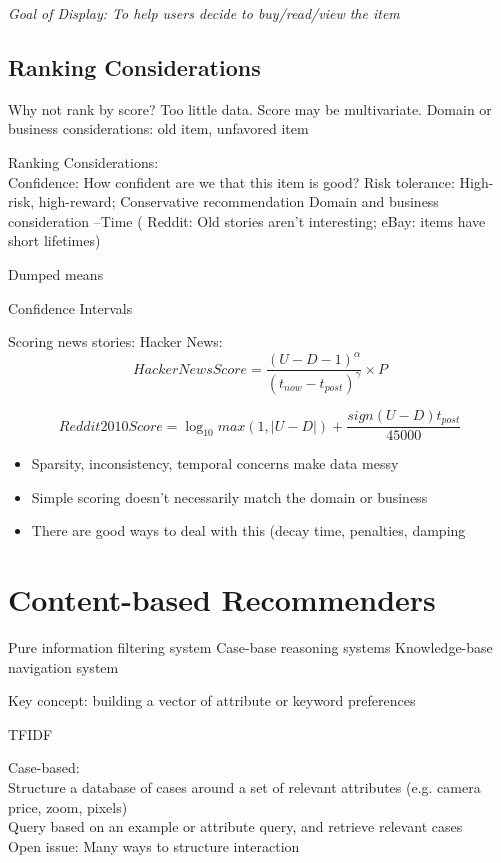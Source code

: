 \documentclass[fleqn,twoside]{article}
\begin{document}
{\it Goal of Display:  To help users decide to buy/read/view the item}

\subsection{Ranking Considerations}

Why not rank by score?
	Too little data.
	Score may be multivariate.
	Domain or business considerations:  old item, unfavored item
	
Ranking Considerations:\\
Confidence: How confident are we that this item is good?
Risk tolerance: High-risk, high-reward; Conservative recommendation
Domain and business consideration --Time ( Reddit: Old stories aren't interesting; eBay: items have short lifetimes)


Dumped means

Confidence Intervals


Scoring news stories:
Hacker News:
\begin{equation}
HackerNewsScore = \frac{(U-D-1)^{\alpha}}{(t_{now}- t_{post})^{\gamma}}\times P
\end{equation}

\begin{equation}
Reddit2010Score = \log_{10} max(1, |U-D|) + \frac{sign(U-D)t_{post}}{45000}
\end{equation}


\begin{itemize}
\item Sparsity, inconsistency, temporal concerns make data messy
\item Simple scoring doesn't necessarily match the domain or business
\item There are good ways to deal with this (decay time, penalties, damping
\end{itemize}



\section{Content-based Recommenders}

  Pure information filtering system
  Case-base reasoning systems
  Knowledge-base navigation system


Key concept: building a vector of attribute or keyword preferences

TFIDF

Case-based: \\
Structure a database of cases  around a set of relevant attributes (e.g. camera price, zoom, pixels) \\
Query based on an example or attribute query, and retrieve relevant cases \\
Open issue: Many ways to structure interaction
\end{document}

